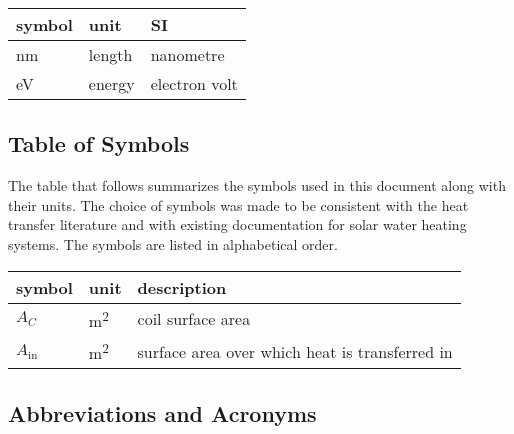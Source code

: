 \documentclass[12pt]{article}
\begin{document}
\renewcommand{\arraystretch}{1.2}
  \noindent \begin{tabular}{l l l} 
    \toprule		
    \textbf{symbol} & \textbf{unit} & \textbf{SI}\\
    \midrule 
    \si{\nano\metre} & length & nanometre\\
    \si{\electronvolt} & energy	& electron volt\\
    \bottomrule
  \end{tabular}


\subsection{Table of Symbols}

The table that follows summarizes the symbols used in this document along with
their units.  The choice of symbols was made to be consistent with the heat
transfer literature and with existing documentation for solar water heating
systems.  The symbols are listed in alphabetical order.

\renewcommand{\arraystretch}{1.2}
\noindent \begin{longtable*}{l l p{12cm}} \toprule
\textbf{symbol} & \textbf{unit} & \textbf{description}\\
\midrule 
$A_C$ & \si[per-mode=symbol] {\square\metre} & coil surface area
\\
$A_\text{in}$ & \si[per-mode=symbol] {\square\metre} & surface area over 
which heat is transferred in
\\ 
\bottomrule
\end{longtable*}

\subsection{Abbreviations and Acronyms}
\end{document}
